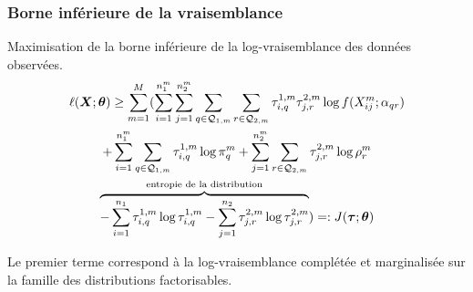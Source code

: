 \documentclass{beamer}
\begin{document}
\begin{frame}
    \frametitle{Borne inférieure de la vraisemblance}
    Maximisation de la borne inférieure de la log-vraisemblance des données observées.
    \begin{multline*}
        \ell (\bm{X};\bm{\theta}) \geq \sum_{m=1}^{M} (\sum_{i = 1}^{n_1^m}\sum_{j=1}^{n_2^m}\sum_{q \in \mathcal{Q}_{1,m}} \sum_{r \in \mathcal{Q}_{2,m}} \tau^{1,m}_{i,q} \tau^{2,m}_{j,r} \log f(X^{m}_{ij}; \alpha_{qr}) \\
        + \sum_{i=1}^{n_1^m} \sum_{q \in \mathcal{Q}_{1,m}} \tau^{1,m}_{i,q} \log \pi_{q}^m + \sum_{j=1}^{n_2^m} \sum_{r \in \mathcal{Q}_{2,m}} \tau^{2,m}_{j,r} \log \rho_{r}^m  \\
        \overbrace{- \sum_{i=1}^{n_1} \tau^{1,m}_{i,q} \log \tau^{1,m}_{i,q} - \sum_{j=1}^{n_2} \tau^{2,m}_{j,r} \log \tau^{2,m}_{j,r} }^{\text{entropie de la distribution}}) =: J(\bm{\tau};\bm{\theta}) $$
    \end{multline*}

    Le premier terme correspond à la log-vraisemblance complétée et marginalisée sur la famille des distributions factorisables.

\end{frame}
\end{document}
